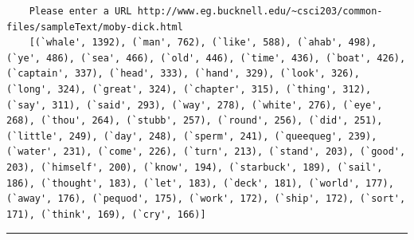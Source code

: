 \documentclass[12pt,letterpaper]{article}
\begin{document}
{\centering
\par}

\begin{lstlisting}
    Please enter a URL http://www.eg.bucknell.edu/~csci203/common-files/sampleText/moby-dick.html
    [(`whale', 1392), (`man', 762), (`like', 588), (`ahab', 498), (`ye', 486), (`sea', 466), (`old', 446), (`time', 436), (`boat', 426), (`captain', 337), (`head', 333), (`hand', 329), (`look', 326), (`long', 324), (`great', 324), (`chapter', 315), (`thing', 312), (`say', 311), (`said', 293), (`way', 278), (`white', 276), (`eye', 268), (`thou', 264), (`stubb', 257), (`round', 256), (`did', 251), (`little', 249), (`day', 248), (`sperm', 241), (`queequeg', 239), (`water', 231), (`come', 226), (`turn', 213), (`stand', 203), (`good', 203), (`himself', 200), (`know', 194), (`starbuck', 189), (`sail', 186), (`thought', 183), (`let', 183), (`deck', 181), (`world', 177), (`away', 176), (`pequod', 175), (`work', 172), (`ship', 172), (`sort', 171), (`think', 169), (`cry', 166)]
\end{lstlisting}

\vspace{4mm}
\hrule
\end{document}

